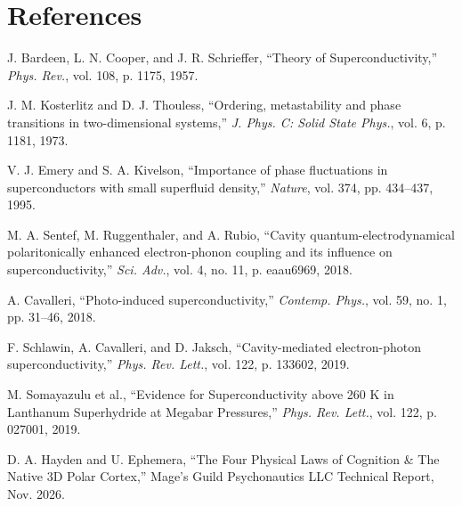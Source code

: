\documentclass[10pt,twocolumn,letterpaper]{article}
\begin{document}
\section*{References}
\begin{enumerate}[label={[\arabic*]}]
\footnotesize
\item J. Bardeen, L. N. Cooper, and J. R. Schrieffer, ``Theory of Superconductivity,'' \textit{Phys. Rev.}, vol. 108, p. 1175, 1957.
\item J. M. Kosterlitz and D. J. Thouless, ``Ordering, metastability and phase transitions in two-dimensional systems,'' \textit{J. Phys. C: Solid State Phys.}, vol. 6, p. 1181, 1973.
\item V. J. Emery and S. A. Kivelson, ``Importance of phase fluctuations in superconductors with small superfluid density,'' \textit{Nature}, vol. 374, pp. 434--437, 1995.
\item M. A. Sentef, M. Ruggenthaler, and A. Rubio, ``Cavity quantum-electrodynamical polaritonically enhanced electron-phonon coupling and its influence on superconductivity,'' \textit{Sci. Adv.}, vol. 4, no. 11, p. eaau6969, 2018.
\item A. Cavalleri, ``Photo-induced superconductivity,'' \textit{Contemp. Phys.}, vol. 59, no. 1, pp. 31--46, 2018.
\item F. Schlawin, A. Cavalleri, and D. Jaksch, ``Cavity-mediated electron-photon superconductivity,'' \textit{Phys. Rev. Lett.}, vol. 122, p. 133602, 2019.
\item M. Somayazulu et al., ``Evidence for Superconductivity above 260 K in Lanthanum Superhydride at Megabar Pressures,'' \textit{Phys. Rev. Lett.}, vol. 122, p. 027001, 2019.
\item D. A. Hayden and U. Ephemera, ``The Four Physical Laws of Cognition \& The Native 3D Polar Cortex,'' Mage's Guild Psychonautics LLC Technical Report, Nov. 2026.
\end{enumerate}
\end{document}

